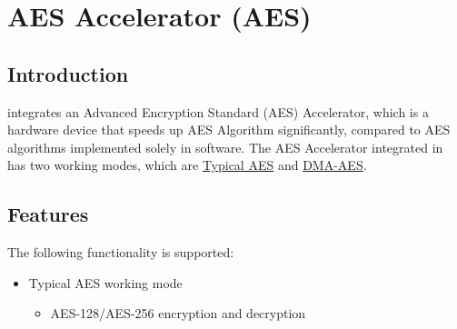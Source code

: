 \documentclass[main\_\_EN.tex]{subfiles}
\begin{document}

\ifglobal
\else
    {\let\clearpage\relax \listoftodos}
    \tableofcontents
\fi



\hypertarget{aes}{}
\chapter{AES Accelerator (AES)}\label{mod:aes}

\section{Introduction}

\chipname{} integrates an Advanced Encryption Standard (AES) Accelerator, which is a hardware device that speeds up AES Algorithm significantly, compared to AES algorithms implemented solely in software. The AES Accelerator integrated in \chipname{} has two working modes, which are \hyperref[sec:aes-typical-modes]{Typical AES} and \hyperref[sec:aes-dma-aes]{DMA-AES}.

\section{Features}

The following functionality is supported:
\begin{itemize}
    \item Typical AES working mode
        \begin{itemize}
            \item AES-128/AES-256 encryption and decryption
        \end{itemize}
    \end{itemize}
\end{document}
